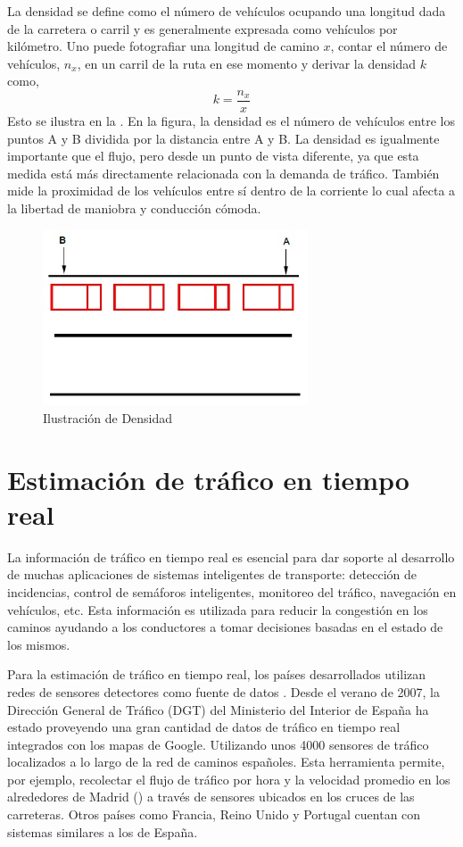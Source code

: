 La densidad se define como el número de vehículos ocupando una longitud dada de la carretera o carril y es generalmente expresada como vehículos por kilómetro. Uno puede fotografiar una longitud de camino $x$, contar el número de vehículos, $n_{x}$, en un carril de la ruta en ese momento y derivar la densidad $k$ como,
\begin{equation}
k=\frac { { n }_{ x } }{ x }
\end{equation}
Esto se ilustra en la . En la figura, la densidad es el número de vehículos entre los puntos A y B dividida por la distancia entre A y B. La densidad es igualmente importante que el flujo, pero desde un punto de vista diferente, ya que esta medida está más directamente relacionada con la demanda de tráfico. También mide la proximidad de los vehículos entre sí dentro de la corriente lo cual afecta a la libertad de maniobra y conducción cómoda.

\begin{figure}[h]
	\centering
	\includegraphics[width=0.7\textwidth]{capitulos/5/figuras/figura1.jpg}
	\caption{\label{fig:densidad} Ilustración de Densidad}	
\end{figure}

\section{Estimación de tráfico en tiempo real}

La información de tráfico en tiempo real es esencial para dar soporte al desarrollo de muchas aplicaciones de sistemas inteligentes de transporte: detección de incidencias, control de semáforos inteligentes, monitoreo del tráfico, navegación en vehículos, etc. Esta información es utilizada para reducir la congestión en los caminos ayudando a los conductores a tomar decisiones basadas en el estado de los mismos.

Para la estimación de tráfico en tiempo real, los países desarrollados utilizan redes de sensores detectores como fuente de datos \cite{leduc2008road}. Desde el verano de 2007, la Dirección General de Tráfico (DGT) del Ministerio del Interior de España ha estado proveyendo una gran cantidad de datos de tráfico en tiempo real integrados con los mapas de Google. Utilizando unos 4000 sensores de tráfico localizados a lo largo de la red de caminos españoles. Esta herramienta permite, por ejemplo, recolectar el flujo de tráfico por hora y la velocidad promedio en los alrededores de Madrid () a través de sensores ubicados en los cruces de las carreteras. Otros países como Francia, Reino Unido y Portugal cuentan con sistemas similares a los de España.

